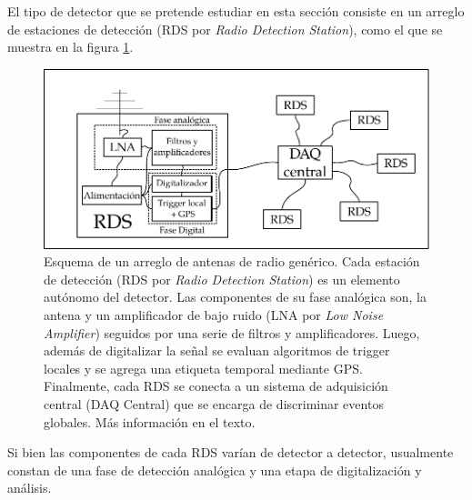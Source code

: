 	El tipo de detector que se pretende estudiar en esta secci\'on consiste en un arreglo de estaciones de detecci\'on (RDS por \emph{Radio Detection Station}), como el que se muestra en la figura \ref{fig:detectorSch}.
		\begin{figure}[ht!]
			\centering
			\includegraphics[width=\textwidth]{./fig/simulacionRadio/antennaSch}
			\caption{\label{fig:detectorSch} Esquema de un arreglo de antenas de radio gen\'erico.
			Cada estaci\'on de detecci\'on (RDS por \emph{Radio Detection Station}) es un elemento aut\'onomo del detector. Las componentes de su fase anal\'ogica son, la antena y un amplificador de bajo ruido (LNA por \emph{Low Noise Amplifier}) seguidos por una serie de filtros y amplificadores. Luego, adem\'as de digitalizar la se\~nal se evaluan algoritmos de trigger locales y se agrega una etiqueta temporal mediante GPS.
			Finalmente, cada RDS se conecta a un sistema de adquisici\'on central (DAQ Central) que se encarga de discriminar eventos globales. M\'as informaci\'on en el texto.
			}
			
		\end{figure}
	Si bien las componentes de cada RDS var\'ian de detector a detector, usualmente constan de una fase de detecci\'on anal\'ogica y una etapa de digitalizaci\'on y an\'alisis.
